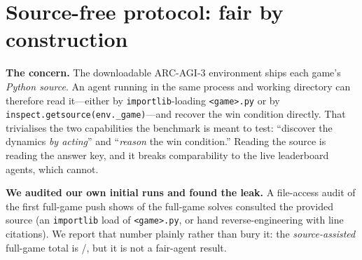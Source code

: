 \section{Source-free protocol: fair by construction}
\label{sec:sourcefree}

\textbf{The concern.} The downloadable ARC-AGI-3 environment ships each game's \emph{Python source}.
An agent running in the same process and working directory can therefore read it---either by
\texttt{importlib}-loading \texttt{<game>.py} or by \texttt{inspect.getsource(env.\_game)}---and recover
the win condition directly. That trivialises the two capabilities the benchmark is meant to test:
``discover the dynamics \emph{by acting}'' and ``\emph{reason} the win condition.'' Reading the source
is reading the answer key, and it breaks comparability to the live leaderboard agents, which cannot.

\textbf{We audited our own initial runs and found the leak.} A file-access audit of the first
full-game push shows \ArcSourceUsedFull{} of the \ArcSourceAssistedFull{} full-game solves consulted
the provided source (an \texttt{importlib} load of \texttt{<game>.py}, or hand reverse-engineering with
line citations). We report that number plainly rather than bury it: the \emph{source-assisted}
full-game total is \ArcSourceAssistedFull/\ArcUnionGames{}, but it is not a fair-agent result.

